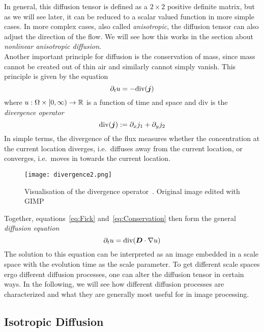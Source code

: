 \noindent In general, this diffusion
tensor is defined as a
$2\times2$ positive definite matrix, but as we will see later, it can be reduced to a scalar 
valued function in more simple cases.
In more complex cases, also called \textit{anisotropic}, the diffusion tensor can also adjust the
direction of the flow. We will see how this works in the section about \textit{nonlinear
anisotropic diffusion}.\\
Another important principle for diffusion is the conservation of mass, since mass cannot be created
out of thin air and similarly cannot simply vanish.
This principle is given by the equation
\begin{equation}
    \partial_t u = - \textnormal{div}(\boldsymbol j)\label{eq:Conservation}
\end{equation}
where $u: \Omega \times [0, \infty) \rightarrow \mathbb{R}$ is a function of time and space and div
is the \textit{divergence operator}
\begin{equation}
    \textnormal{div}(\boldsymbol j) := \partial_x j_1 + \partial_y j_2
\end{equation}
In simple terms, the divergence of the flux measures whether the concentration at the current
location diverges, i.e.\ diffuses away from the current location, or converges, i.e.\ moves in
towards the current location.
\begin{figure}[H]
    \centering
    \texttt{[image: divergence2.png]}
    \caption{Visualisation of the divergence operator~\cite{img-divergence}. Original image edited
    with GIMP~\cite{gimp}}\label{fig:Divergence}
\end{figure}
\noindent Together, equations~\eqref{eq:Fick} and~\eqref{eq:Conservation} then form the general \textit{diffusion
    equation}~\cite{dic, weickert96}
\begin{equation}
    \partial_t u = \textnormal{div}(\boldsymbol D\cdot\mathbf{\nabla} u)\label{eq:Diffusion}
\end{equation}
The solution to this equation can be interpreted as an image embedded in a scale space with the
evolution time as the scale parameter. To get different scale spaces ergo different diffusion
processes, one can alter the diffusion tensor in certain ways.
In the following, we will see how different diffusion processes are characterized and what they are
generally most useful for in image processing.

\subsection{Isotropic Diffusion}
